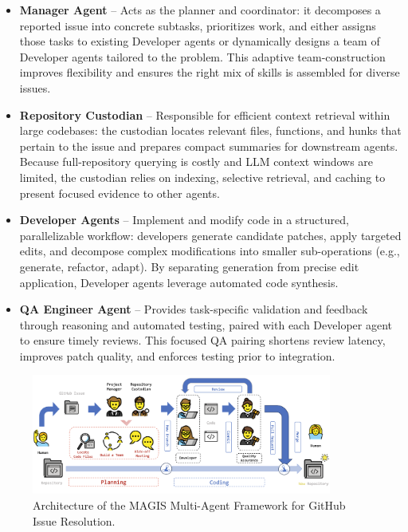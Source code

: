 \begin{itemize}
    \item \textbf{Manager Agent} -- Acts as the planner and coordinator: it decomposes a reported issue into concrete subtasks, prioritizes work, and either assigns those tasks to existing Developer agents or dynamically designs a team of Developer agents tailored to the problem. This adaptive team-construction improves flexibility and ensures the right mix of skills is assembled for diverse issues.
    \item \textbf{Repository Custodian} -- Responsible for efficient context retrieval within large codebases: the custodian locates relevant files, functions, and hunks that pertain to the issue and prepares compact summaries for downstream agents. Because full-repository querying is costly and LLM context windows are limited, the custodian relies on indexing, selective retrieval, and caching to present focused evidence to other agents.
    \item \textbf{Developer Agents} -- Implement and modify code in a structured, parallelizable workflow: developers generate candidate patches, apply targeted edits, and decompose complex modifications into smaller sub-operations (e.g., generate, refactor, adapt). By separating generation from precise edit application, Developer agents leverage automated code synthesis.
    \item \textbf{QA Engineer Agent} -- Provides task-specific validation and feedback through reasoning and automated testing, paired with each Developer agent to ensure timely reviews. This focused QA pairing shortens review latency, improves patch quality, and enforces testing prior to integration.
\end{itemize}

\begin{figure}[h!]
    \centering
    \includegraphics[width=0.88\textwidth]{figures/magis-architecture.png}
    \caption{Architecture of the MAGIS Multi-Agent Framework for GitHub Issue Resolution.}
    \label{fig:magis_architecture}
\end{figure}

